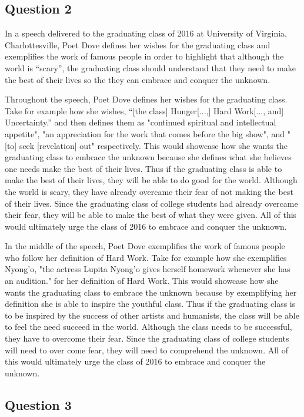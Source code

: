 \documentclass[10pt]{article}
\begin{document}
\subsection{Question 2}

In a speech delivered to the graduating class of 2016 at University of Virginia, Charlottesville, Poet Dove defines her wishes for the graduating class and exemplifies the work of famous people in order to highlight that although the world is “scary”, the graduating class should understand that they need to make the best of their lives so the they can embrace and conquer the unknown.

Throughout the speech, Poet Dove defines her wishes for the graduating class. Take for example how she wishes, “[the class] Hunger[...,] Hard Work[..., and] Uncertainty.” and then defines them as "continued spiritual and intellectual appetite", "an appreciation for the work that comes before the big show", and "[to] seek [revelation] out" respectively. This would showcase how she wants the graduating class to embrace the unknown because she defines what she believes one needs make the best of their lives. Thus if the graduating class is able to make the best of their lives, they will be able to do good for the world. Although the world is scary, they have already overcame their fear of not making the best of their lives. Since the graduating class of college students had already overcame their fear, they will be able to make the best of what they were given. All of this would ultimately urge the class of 2016 to embrace and conquer the unknown.

In the middle of the speech, Poet Dove exemplifies the work of famous people who follow her definition of Hard Work. Take for example how she exemplifies Nyong'o, "the actress Lupita Nyong’o gives herself homework whenever she has an audition." for her definition of Hard Work. This would showcase how she wants the graduating class to embrace the unknown because by exemplifying her definition she is able to inspire the youthful class. Thus if the graduating class is to be inspired by the success of other artists and humanists, the class will be able to feel the need succeed in the world. Although the class needs to be successful, they have to overcome their fear. Since the graduating class of college students will need to over come fear, they will need to comprehend the unknown. All of this would ultimately urge the class of 2016 to embrace and conquer the unknown.

\subsection{Question 3}
\end{document}
